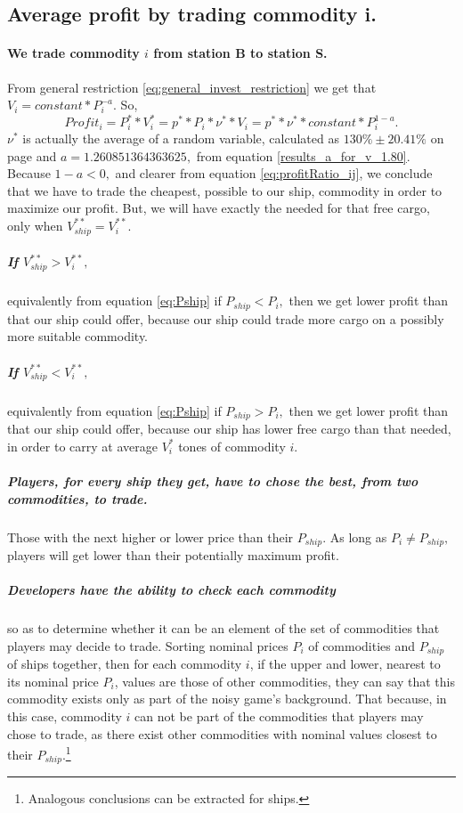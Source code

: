 \documentclass[]{article}
\begin{document}
\subsection{Average profit by trading commodity i.}
\paragraph{We trade commodity $i$ from station B to station S.} 
From general restriction \eqref{eq:general_invest_restriction} we get that $V_{i}=constant*P^{-a}_{i}.$ So,
\[Profit_{i}=P^{*}_{i}*V^{*}_{i}=p^{*}*P_{i}*\nu^{*}*V_{i}=p^{*}*\nu^{*}*constant*P^{1-a}_{i}.\]
$\nu^{*}$ is actually the average of a random variable, calculated as $130\%\pm20.41\%$ on page \pageref{std_of_v} and $a=1.260851364363625,$ from equation \eqref{results_a_for_v_1.80}.
Because $1-a<0,$ and clearer from equation \eqref{eq:profitRatio_ij}, we conclude that we have to trade the cheapest, possible to our ship, commodity in order to maximize our profit. But, we will have exactly the needed for that free cargo, only when $V^{**}_{ship}=V^{**}_{i}.$ 

\subparagraph*{If $V^{**}_{ship}>V^{**}_{i},$} equivalently from equation \eqref{eq:Pship} if $P_{ship}<P_{i},$ then we get lower profit than that our ship could offer, because our ship could trade more cargo on a possibly more suitable commodity. 
\subparagraph*{If $V^{**}_{ship}<V^{**}_{i},$} equivalently from equation \eqref{eq:Pship} if $P_{ship}>P_{i},$ then we get lower profit than that our ship could offer, because our ship has lower free cargo than that needed, in order to carry at average $V^{*}_{i}$ tones of commodity $i.$
\subparagraph{Players, for every ship they get, have to chose the best, from two commodities, to trade.} Those with the next higher or lower price than their $P_{ship}.$ As long as $P_{i}\neq P_{ship},$ players will get lower than their potentially maximum profit.
\subparagraph{Developers have the ability to check each commodity} so as to determine whether it can be an element of the set of commodities that players may decide to trade. Sorting nominal prices $P_{i}$ of commodities  and $P_{ship}$ of ships together, then for each commodity $i$, if the upper and lower, nearest to its nominal price $P_{i}$, values are those of other commodities, they can say that this commodity exists only as part of the noisy game's background. That because, in this case, commodity $i$ can not be part of the commodities that players may chose to trade, as there exist other commodities with nominal values closest to their $P_{ship}.$\footnote{Analogous conclusions can be extracted for ships.}
\end{document}
